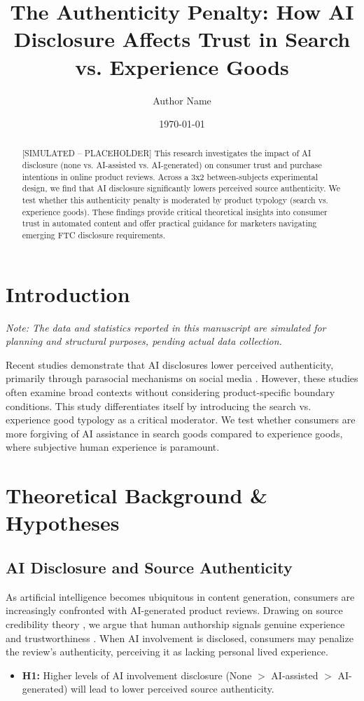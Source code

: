 \documentclass[12pt, letterpaper]{article}
\title{The Authenticity Penalty: How AI Disclosure Affects Trust in Search vs. Experience Goods}
\author{Author Name}
\affil{University Affiliation}
\date{\today}
\begin{document}
\maketitle

\begin{abstract}
[SIMULATED -- PLACEHOLDER] This research investigates the impact of AI disclosure (none vs. AI-assisted vs. AI-generated) on consumer trust and purchase intentions in online product reviews. Across a 3x2 between-subjects experimental design, we find that AI disclosure significantly lowers perceived source authenticity. We test whether this authenticity penalty is moderated by product typology (search vs. experience goods). These findings provide critical theoretical insights into consumer trust in automated content and offer practical guidance for marketers navigating emerging FTC disclosure requirements.
\end{abstract}

\newpage

\section{Introduction}
\textit{Note: The data and statistics reported in this manuscript are simulated for planning and structural purposes, pending actual data collection.}

Recent studies demonstrate that AI disclosures lower perceived authenticity, primarily through parasocial mechanisms on social media \citep{carney2026}. However, these studies often examine broad contexts without considering product-specific boundary conditions. This study differentiates itself by introducing the search vs. experience good typology as a critical moderator. We test whether consumers are more forgiving of AI assistance in search goods compared to experience goods, where subjective human experience is paramount.

\section{Theoretical Background \& Hypotheses}
\subsection{AI Disclosure and Source Authenticity}
As artificial intelligence becomes ubiquitous in content generation, consumers are increasingly confronted with AI-generated product reviews. Drawing on source credibility theory \citep{ohanian1990}, we argue that human authorship signals genuine experience and trustworthiness \citep{mcknight2002}. When AI involvement is disclosed, consumers may penalize the review's authenticity, perceiving it as lacking personal lived experience.
\begin{itemize}
    \item \textbf{H1:} Higher levels of AI involvement disclosure (None $>$ AI-assisted $>$ AI-generated) will lead to lower perceived source authenticity.
\end{itemize}
\end{document}
